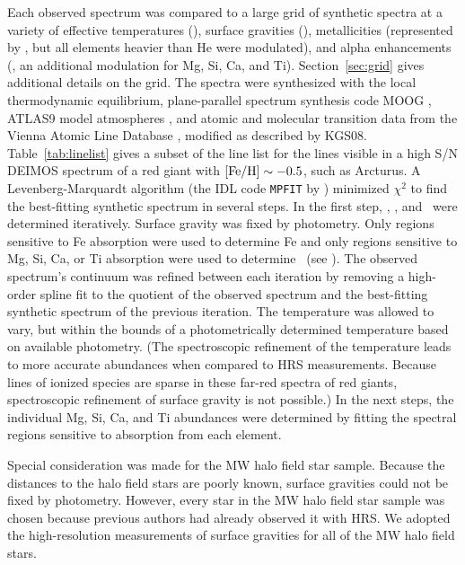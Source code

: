 \documentclass{emulateapj}
\begin{document}
Each observed spectrum was compared to a large grid of synthetic
spectra at a variety of effective temperatures (\teff), surface
gravities (\logg), metallicities (represented by \feh, but all
elements heavier than He were modulated), and alpha enhancements
(\afe, an additional modulation for Mg, Si, Ca, and Ti).
Section~\ref{sec:grid} gives additional details on the grid.  The
spectra were synthesized with the local thermodynamic equilibrium,
plane-parallel spectrum synthesis code MOOG \citep{sne73}, ATLAS9
model atmospheres \citep{kur93,sbo04,sbo05}, and atomic and molecular
transition data from the Vienna Atomic Line Database
\citep[VALD,][]{kup99}, modified as described by KGS08.
Table~\ref{tab:linelist} gives a subset of the line list for the lines
visible in a high S/N DEIMOS spectrum of a red giant with ${\rm [Fe/H]}
\sim -0.5$, such as Arcturus.  A Levenberg-Marquardt algorithm (the
IDL code \texttt{MPFIT} by \citeauthor{mark09} \citeyear{mark09})
minimized $\chi^2$ to find the best-fitting synthetic spectrum in
several steps.  In the first step, \teff, \feh, and \afe\ were
determined iteratively.  Surface gravity was fixed by photometry.
Only regions sensitive to Fe absorption were used to determine Fe and
only regions sensitive to Mg, Si, Ca, or Ti absorption were used to
determine \afe\ (see \citeauthor*{kir09}).  The observed spectrum's
continuum was refined between each iteration by removing a high-order
spline fit to the quotient of the observed spectrum and the
best-fitting synthetic spectrum of the previous iteration.  The
temperature was allowed to vary, but within the bounds of a
photometrically determined temperature based on available photometry.
(The spectroscopic refinement of the temperature leads to more
accurate abundances when compared to HRS measurements.  Because lines
of ionized species are sparse in these far-red spectra of red giants,
spectroscopic refinement of surface gravity is not possible.)  In the
next steps, the individual Mg, Si, Ca, and Ti abundances were
determined by fitting the spectral regions sensitive to absorption
from each element.

Special consideration was made for the MW halo field star sample.
Because the distances to the halo field stars are poorly known,
surface gravities could not be fixed by photometry.  However, every
star in the MW halo field star sample was chosen because previous
authors had already observed it with HRS.  We adopted the
high-resolution measurements of surface gravities for all of the MW
halo field stars.
\end{document}
